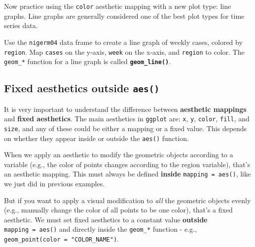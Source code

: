 \documentclass[
  letterpaper,
  DIV=11,
  numbers=noendperiod]{scrreprt}
\begin{document}
Now practice using the \texttt{color} aesthetic mapping with a new plot
type: line graphs. Line graphs are generally considered one of the best
plot types for time series data.

\begin{tcolorbox}[enhanced jigsaw, colframe=quarto-callout-tip-color-frame, colbacktitle=quarto-callout-tip-color!10!white, titlerule=0mm, opacitybacktitle=0.6, breakable, toprule=.15mm, arc=.35mm, rightrule=.15mm, colback=white, bottomrule=.15mm, opacityback=0, toptitle=1mm, left=2mm, bottomtitle=1mm, title=\textcolor{quarto-callout-tip-color}{\faLightbulb}\hspace{0.5em}{Practice}, leftrule=.75mm, coltitle=black]

Use the \texttt{nigerm04} data frame to create a line graph of weekly
cases, colored by \texttt{region}. Map \texttt{cases} on the y-axis,
\texttt{week} on the x-axis, and \texttt{region} to color. The
\texttt{geom\_*} function for a line graph is called
\textbf{\texttt{geom\_line()}}.

\end{tcolorbox}

\hypertarget{fixed-aesthetics-outside-aes}{%
\subsection{\texorpdfstring{Fixed aesthetics outside
\texttt{aes()}}{Fixed aesthetics outside aes()}}\label{fixed-aesthetics-outside-aes}}

It is very important to understand the difference between
\textbf{aesthetic mappings} and \textbf{fixed aesthetics}. The main
aesthetics in \texttt{ggplot} are: \texttt{x}, \texttt{y},
\texttt{color}, \texttt{fill}, and \texttt{size}, and any of these could
be either a mapping or a fixed value. This depends on whether they
appear inside or outside the \texttt{aes()} function.

When we apply an aesthetic to modify the geometric objects according to
a variable (e.g., the color of points changes according to the region
variable), that's an aesthetic mapping. This must always be defined
\textbf{inside} \texttt{mapping\ =\ aes()}, like we just did in previous
examples.

But if you want to apply a visual modification to \emph{all} the
geometric objects evenly (e.g., manually change the color of all points
to be one color), that's a fixed aesthetic. We must set fixed aesthetics
to a constant value \textbf{outside} \texttt{mapping\ =\ aes()} and
directly inside the \texttt{geom\_*} function - e.g.,
\texttt{geom\_point(color\ =\ "COLOR\_NAME")}.
\end{document}
